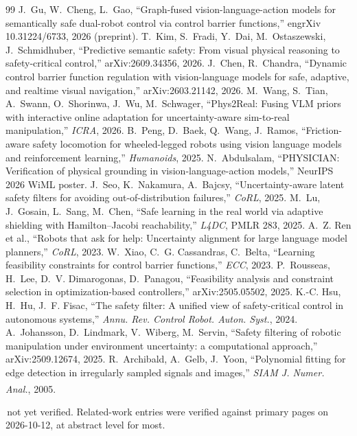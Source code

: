 \documentclass[10pt,twocolumn,letterpaper]{article}
\newcommand{\tv}{\textsuperscript{\dag}}  %
\begin{document}
{\begin{thebibliography}{99}
 J.~Gu, W.~Cheng, L.~Gao, ``Graph-fused vision-language-action models for semantically safe dual-robot control via control barrier functions,'' engrXiv 10.31224/6733, 2026 (preprint).
 T.~Kim, S.~Fradi, Y.~Dai, M.~Ostaszewski, J.~Schmidhuber, ``Predictive semantic safety: From visual physical reasoning to safety-critical control,'' arXiv:2609.34356, 2026.
 J.~Chen, R.~Chandra, ``Dynamic control barrier function regulation with vision-language models for safe, adaptive, and realtime visual navigation,'' arXiv:2603.21142, 2026.
 M.~Wang, S.~Tian, A.~Swann, O.~Shorinwa, J.~Wu, M.~Schwager, ``Phys2Real: Fusing VLM priors with interactive online adaptation for uncertainty-aware sim-to-real manipulation,'' \emph{ICRA}, 2026.
 B.~Peng, D.~Baek, Q.~Wang, J.~Ramos, ``Friction-aware safety locomotion for wheeled-legged robots using vision language models and reinforcement learning,'' \emph{Humanoids}, 2025.
 N.~Abdulsalam, ``PHYSICIAN: Verification of physical grounding in vision-language-action models,'' NeurIPS 2026 WiML poster.
 J.~Seo, K.~Nakamura, A.~Bajcsy, ``Uncertainty-aware latent safety filters for avoiding out-of-distribution failures,'' \emph{CoRL}, 2025.
 M.~Lu, J.~Gosain, L.~Sang, M.~Chen, ``Safe learning in the real world via adaptive shielding with Hamilton--Jacobi reachability,'' \emph{L4DC}, PMLR 283, 2025.
 A.~Z. Ren et al., ``Robots that ask for help: Uncertainty alignment for large language model planners,'' \emph{CoRL}, 2023.
 W.~Xiao, C.~G. Cassandras, C.~Belta, ``Learning feasibility constraints for control barrier functions,'' \emph{ECC}, 2023.
 P.~Rousseas, H.~Lee, D.~V. Dimarogonas, D.~Panagou, ``Feasibility analysis and constraint selection in optimization-based controllers,'' arXiv:2505.05502, 2025.
 K.-C. Hsu, H.~Hu, J.~F. Fisac, ``The safety filter: A unified view of safety-critical control in autonomous systems,'' \emph{Annu. Rev. Control Robot. Auton. Syst.}, 2024.
 A.~Johansson, D.~Lindmark, V.~Wiberg, M.~Servin, ``Safety filtering of robotic manipulation under environment uncertainty: a computational approach,'' arXiv:2509.12674, 2025.
 R.~Archibald, A.~Gelb, J.~Yoon, ``Polynomial fitting for edge detection in irregularly sampled signals and images,'' \emph{SIAM J. Numer. Anal.}, 2005.\tv
\end{thebibliography}
\vspace{-1mm}\noindent\dag\,not yet verified. Related-work entries were verified against primary pages on 2026-10-12, at abstract level for most.\par}
\end{document}
